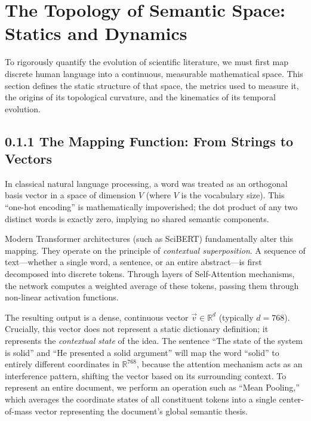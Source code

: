 \section{The Topology of Semantic Space: Statics and Dynamics}

To rigorously quantify the evolution of scientific literature, we must first map discrete human language into a continuous, measurable mathematical space. This section defines the static structure of that space, the metrics used to measure it, the origins of its topological curvature, and the kinematics of its temporal evolution.

\subsection*{0.1.1 The Mapping Function: From Strings to Vectors}

In classical natural language processing, a word was treated as an orthogonal basis vector in a space of dimension $V$ (where $V$ is the vocabulary size). This ``one-hot encoding'' is mathematically impoverished; the dot product of any two distinct words is exactly zero, implying no shared semantic components.

Modern Transformer architectures (such as SciBERT) fundamentally alter this mapping. They operate on the principle of \textit{contextual superposition}. A sequence of text—whether a single word, a sentence, or an entire abstract—is first decomposed into discrete tokens. Through layers of Self-Attention mechanisms, the network computes a weighted average of these tokens, passing them through non-linear activation functions.

The resulting output is a dense, continuous vector $\vec{v} \in \mathbb{R}^d$ (typically $d=768$). Crucially, this vector does not represent a static dictionary definition; it represents the \textit{contextual state} of the idea. The sentence ``The state of the system is solid'' and ``He presented a solid argument'' will map the word ``solid'' to entirely different coordinates in $\mathbb{R}^{768}$, because the attention mechanism acts as an interference pattern, shifting the vector based on its surrounding context. To represent an entire document, we perform an operation such as ``Mean Pooling,'' which averages the coordinate states of all constituent tokens into a single center-of-mass vector representing the document's global semantic thesis.

